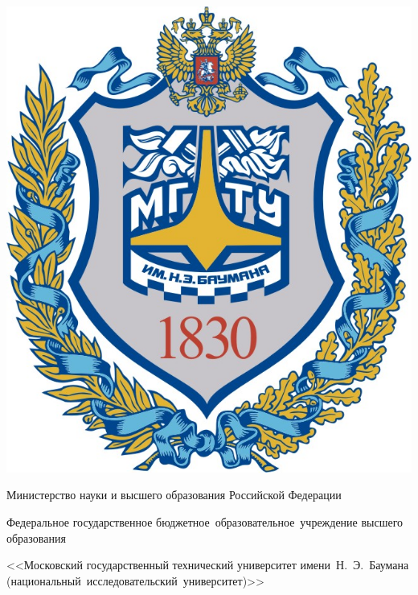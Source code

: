 \documentclass[a4paper,14pt,unknownkeysallowed]{extreport}
\begin{document}
\begin{titlepage}
    \begin{center}
        \fontsize{12pt}{12pt}\selectfont

        \fbox
        {
            \begin{minipage}{0.15\textwidth}
                \includegraphics[width=\linewidth]{images/bmstu.png}
            \end{minipage}
            \hfill

            \vrule
            \hspace{0.2cm}

            \begin{minipage}{0.80\textwidth}\centering\bfseries
                {
                    \linespread{1}\selectfont
                    {Министерство науки и высшего образования Российской Федерации}

                    {Федеральное государственное бюджетное~образовательное~учреждение высшего образования}

                    {<<Московский государственный технический университет имени~Н.~Э.~Баумана (национальный~исследовательский~университет)>>}

}
\end{minipage}}
\end{center}
\end{titlepage}
\end{document}
